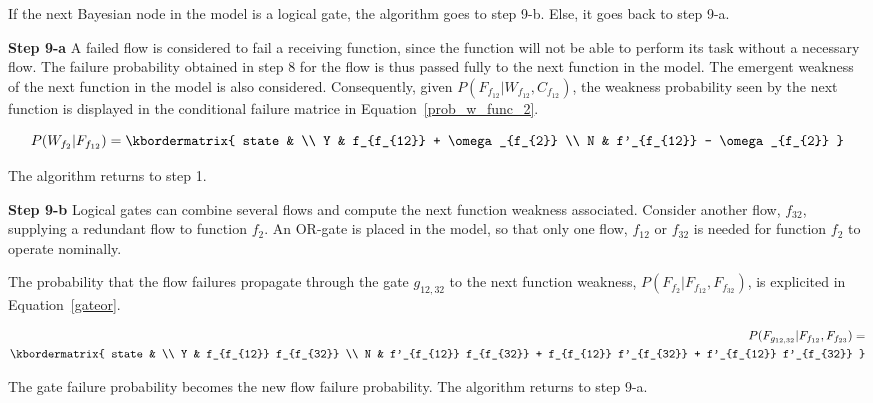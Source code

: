 If the next Bayesian node in the model is a logical gate, the algorithm goes to step 9-b. Else, it goes back to step 9-a.



\textbf{Step 9-a}\hspace{5pt}
A failed flow is considered to fail a receiving function, since the function will not be able to perform its task without a necessary flow. The failure probability obtained in step 8 for the flow is thus passed fully to the next function in the model. The emergent weakness of the next function in the model is also considered. Consequently, given $P(F_{f_{12}} | W_{f_{12}}, C_{f_{12}})$, the weakness probability seen by the next function is displayed in the conditional failure matrice in Equation~\ref{prob_w_func_2}.


\begin{equation}
  P(W_{f_{2}} | F_{f_{12}}) = \kbordermatrix{
    state  & \\
    Y & f_{f_{12}} + \omega_{f_{2}} \\
    N & f'_{f_{12}} - \omega_{f_{2}}
  }
\label{prob_w_func_2}
\end{equation}

The algorithm returns to step 1.


\textbf{Step 9-b}\hspace{5pt}
Logical gates can combine several flows and compute the next function weakness associated. Consider another flow, $f_{32}$, supplying a redundant flow to function $f_2$. An OR-gate is placed in the model, so that only one flow, $f_{12}$ or $f_{32}$ is needed for function $f_2$ to operate nominally.

The probability that the flow failures propagate through the gate $g_{12, 32}$ to the next function weakness, $P(F_{f_2} | F_{f_{12}}, F_{f_{32}})$, is explicited in Equation~\ref{gateor}.

\begin{equation}
\begin{aligned}
  P(F_{g_{12, 32}} | F_{f_{12}}, F_{f_{23}}) = \\ \kbordermatrix{
    state  & \\
    Y & f_{f_{12}} f_{f_{32}} \\
    N & f'_{f_{12}} f_{f_{32}} + f_{f_{12}} f'_{f_{32}} + f'_{f_{12}} f'_{f_{32}}
  }
\end{aligned}
\label{gateor}
\end{equation}


The gate failure probability becomes the new flow failure probability. The algorithm returns to step 9-a.

